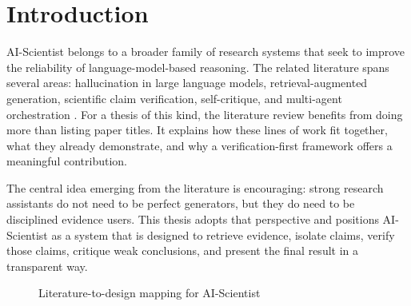 \section{Introduction}

AI-Scientist belongs to a broader family of research systems that seek to improve the reliability of language-model-based reasoning. The related literature spans several areas: hallucination in large language models, retrieval-augmented generation, scientific claim verification, self-critique, and multi-agent orchestration \cite{ji2023hallucination,huang2023hallucinationsurvey,ragsurvey2024}. For a thesis of this kind, the literature review benefits from doing more than listing paper titles. It explains how these lines of work fit together, what they already demonstrate, and why a verification-first framework offers a meaningful contribution.

The central idea emerging from the literature is encouraging: strong research assistants do not need to be perfect generators, but they do need to be disciplined evidence users. This thesis adopts that perspective and positions AI-Scientist as a system that is designed to retrieve evidence, isolate claims, verify those claims, critique weak conclusions, and present the final result in a transparent way.

\begin{figure}[H]
\centering
{}
\caption{Literature-to-design mapping for AI-Scientist}
\label{fig:lit_to_design}
\end{figure}

